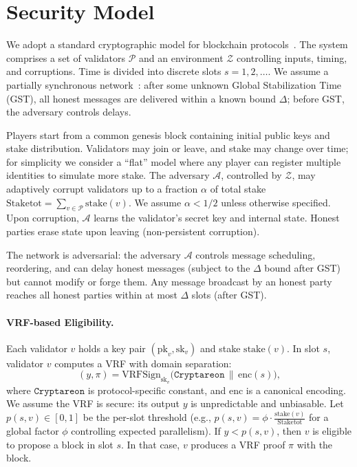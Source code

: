 \documentclass[11pt]{article}
\newcommand{\cZ}{\ensuremath{\mathscr{Z}}\xspace}
\newcommand{\cA}{\ensuremath{\mathscr{A}}\xspace}
\newcommand{\cP}{\ensuremath{\mathscr{P}}\xspace}
\newcommand{\pk}{\ensuremath{\mathrm{pk}}\xspace}
\newcommand{\sk}{\ensuremath{\mathrm{sk}}\xspace}
\newcommand{\stake}{\ensuremath{\mathrm{stake}}\xspace}
\newcommand{\StakeTot}{\ensuremath{\mathrm{Stake}{\mathrm{tot}}}\xspace}
\newcommand{\stakefrac}[1]{\ensuremath{\frac{\stake(#1)}{\StakeTot}}\xspace}
\newcommand{\VRFSign}{\ensuremath{\mathrm{VRFSign}}\xspace}
\newcommand{\domsep}{\ensuremath{\mathtt{Cryptareon}}\xspace}
\newcommand{\Encode}{\ensuremath{\mathrm{enc}}\xspace}
\begin{document}
\section{Security Model}
\label{sec:model}

We adopt a standard cryptographic model for blockchain protocols~\cite{EC:GarKiaLeo15,EC:PasSeeShe17,JC:Canetti00}. The system comprises a set of validators $\cP$ and an environment $\cZ$ controlling inputs, timing, and corruptions. Time is divided into discrete slots $s=1,2,\ldots$. We assume a partially synchronous network~\cite{DLS88,EC:PasSeeShe17}: after some unknown Global Stabilization Time (GST), all honest messages are delivered within a known bound $\Delta$; before GST, the adversary controls delays. 

Players start from a common genesis block containing initial public keys and stake distribution. Validators may join or leave, and stake may change over time; for simplicity we consider a “flat” model where any player can register multiple identities to simulate more stake. The adversary $\cA$, controlled by $\cZ$, may adaptively corrupt validators up to a fraction $\alpha$ of total stake $\StakeTot=\sum_{v\in\cP}\stake(v)$. We assume $\alpha < 1/2$ unless otherwise specified. Upon corruption, $\cA$ learns the validator's secret key and internal state. Honest parties erase state upon leaving (non-persistent corruption).

The network is adversarial: the adversary $\cA$ controls message scheduling, reordering, and can delay honest messages (subject to the $\Delta$ bound after GST) but cannot modify or forge them. Any message broadcast by an honest party reaches all honest parties within at most $\Delta$ slots (after GST). 

\paragraph{VRF-based Eligibility.} Each validator $v$ holds a key pair $(\pk_v,\sk_v)$ and stake $\stake(v)$. In slot $s$, validator $v$ computes a VRF with domain separation:
\begin{equation*}
(y,\pi) = \VRFSign_{\sk_v}\bigl(\domsep \,\|\,\Encode(s)\bigr),
\end{equation*}
where $\domsep$ is protocol-specific constant, and $\Encode$ is a canonical encoding. We assume the VRF is secure: its output $y$ is unpredictable and unbiasable. Let $p(s,v)\in[0,1]$ be the per-slot threshold (e.g., $p(s,v) = \phi\cdot \stakefrac{v}$ for a global factor $\phi$ controlling expected parallelism). If $y < p(s,v)$, then $v$ is eligible to propose a block in slot $s$. In that case, $v$ produces a VRF proof $\pi$ with the block.
\end{document}
